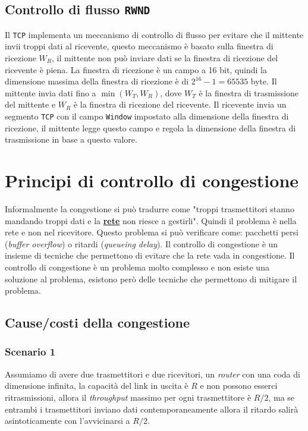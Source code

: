     \subsection{Controllo di flusso \texttt{RWND}}
        Il \texttt{TCP} implementa un meccanismo di controllo di flusso per evitare che il mittente invii troppi dati al ricevente, questo meccanismo è basato sulla finestra di ricezione $ W_R $, il mittente non può inviare dati se la finestra di ricezione del ricevente è piena. La finestra di ricezione è un campo a 16 bit, quindi la dimensione massima della finestra di ricezione è di $ 2^{16} - 1 = 65535 $ byte. Il mittente invia dati fino a $ \min(W_T, W_R) $, dove $ W_T $ è la finestra di trasmissione del mittente e $ W_R $ è la finestra di ricezione del ricevente. Il ricevente invia un segmento \texttt{TCP} con il campo \texttt{Window} impostato alla dimensione della finestra di ricezione, il mittente legge questo campo e regola la dimensione della finestra di trasmissione in base a questo valore.
\section{Principi di controllo di congestione}
    Informalmente la congestione si può tradurre come "troppi trasmettitori stanno mandando troppi dati e la \underline{\textbf{rete}} non riesce a gestirli". Quindi il problema è nella rete e non nel ricevitore. Questo problema si può verificare come: pacchetti persi (\textit{buffer overflow}) o ritardi (\textit{queueing delay}). Il controllo di congestione è un insieme di tecniche che permettono di evitare che la rete vada in congestione. Il controllo di congestione è un problema molto complesso e non esiste una soluzione al problema, esistono però delle tecniche che permettono di mitigare il problema.
    \subsection{Cause/costi della congestione}
        \subsubsection{Scenario 1}
            Assumiamo di avere due trasmettitori e due ricevitori, un \textit{router} con una coda di dimensione infinita, la capacità del link in uscita è $ R $ e non possono esserci ritrasmissioni, allora il \textit{throughput} massimo per ogni trasmettitore è $ R/2 $, ma se entrambi i trasmettitori inviano dati contemporaneamente allora il ritardo salirà asintoticamente con l'avvicinarsi a $ R/2 $.
